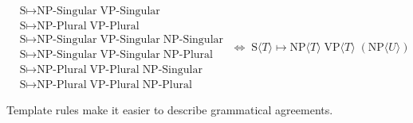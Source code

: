 \documentclass[../main.tex]{subfiles}
\begin{document}
\begin{figure}
	\begin{equation*}
	\begin{aligned}
	& \text{S} \mapsto \text{NP-Singular} \; \text{VP-Singular} \\
	& \text{S} \mapsto \text{NP-Plural} \; \text{VP-Plural} \\
	& \text{S} \mapsto \text{NP-Singular} \; \text{VP-Singular} \; \text{NP-Singular} \\
	& \text{S} \mapsto \text{NP-Singular} \; \text{VP-Singular} \; \text{NP-Plural} \\
	& \text{S} \mapsto \text{NP-Plural} \; \text{VP-Plural} \; \text{NP-Singular} \\
	& \text{S} \mapsto \text{NP-Plural} \; \text{VP-Plural} \; \text{NP-Plural}
	\end{aligned}
	\; \Longleftrightarrow \;
	\text{S} \langle T \rangle \mapsto \text{NP}\langle T \rangle \; \text{VP} \langle T \rangle \; (\text{NP} \langle U \rangle )
	\end{equation*}
	\caption{Template rules make it easier to describe grammatical agreements.}
	\label{fig:template_rule}
\end{figure}
\end{document}
